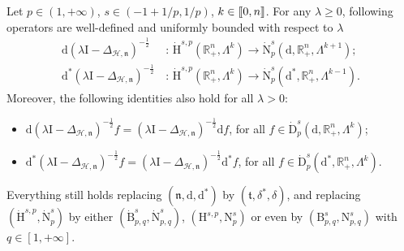 \documentclass[AHL,Unicode,longabstracts,published]{cedram}
\newcommand{\bbR}{\mathbb{R}}
\newcommand{\rmH}{\mathrm{H}}%
\newcommand{\rmB}{\mathrm{B}}
\newcommand{\rmd}{\mathrm{d}}
\newcommand{\rmD}{\mathrm{D}}
\newcommand{\rmN}{\mathrm{N}}
\newcommand{\rmI}{\mathrm{I}}
\newcommand{\clH}{\mathcal{H}}
\newcommand{\fkn}{\mathfrak{n}}
\newcommand{\fkt}{\mathfrak{t}}
\newcommand{\llbracket}{\mathopen{[\mkern -2.7mu[}}
\newcommand{\rrbracket}{\mathclose{]\mkern -2.7mu]}}
\newcommand{\llb}{\llbracket}
\newcommand{\rrb}{\rrbracket}
\begin{document}
\begin{prop}\label{prop:RieszTransformHodgeHspBspqRn+}
Let $p\in(1,+\infty)$, $s\in(-1+1/p,1/p)$, $k\in\llb 0,n\rrb$. For any $\lambda\geqslant 0$, following operators are well-defined and uniformly bounded with respect to $\lambda$
\begin{align*}
\rmd\left(\lambda \rmI -\Delta_{\clH,\fkn}\right)^{-\frac{1}{2}}\,&:\,\dot{\rmH}^{s,p}\left(\bbR^{n}_+,\Lambda^k\right)\longrightarrow \dot{\rmN}^{s}_{p}\left(\rmd,\bbR^{n}_+,\Lambda^{k+1}\right);\\
\rmd^\ast\left(\lambda \rmI -\Delta_{\clH,\fkn}\right)^{-\frac{1}{2}}\,&:\,\dot{\rmH}^{s,p}\left(\bbR^{n}_+,\Lambda^k\right)\longrightarrow \dot{\rmN }^{s}_{p}\left(\rmd^\ast,\bbR^{n}_+,\Lambda^{k-1}\right).
\end{align*}
Moreover, the following identities also hold for all $\lambda>0$:
\begin{itemize}
\item $\rmd(\lambda \rmI -\Delta_{\clH,\fkn})^{-\frac{1}{2}}f = (\lambda \rmI -\Delta_{\clH,\fkn})^{-\frac{1}{2}} \rmd f$, \qquad for all $f\in\dot{\rmD}^s_{p}(\rmd,\bbR^n_+,\Lambda^k)$;
\item $\rmd^\ast(\lambda \rmI -\Delta_{\clH,\fkn})^{-\frac{1}{2}}f = (\lambda \rmI -\Delta_{\clH,\fkn})^{-\frac{1}{2}} \rmd^\ast f$, \qquad for all $f\in\dot{\rmD}^s_{p}(\rmd^\ast,\bbR^n_+,\Lambda^k)$.
\end{itemize}
Everything still holds replacing $(\fkn,\rmd,\rmd^\ast)$ by $(\fkt,\delta^\ast,\delta)$, and replacing $(\dot{\rmH}^{s,p},\dot{\rmN}^{s}_{p})$ by either $(\dot{\rmB}^{s}_{p,q},\dot{\rmN }^{s}_{p,q})$, $({\rmH}^{s,p},{\rmN}^{s}_{p})$ or even by $({\rmB}^{s}_{p,q},{\rmN}^{s}_{p,q})$ with $q\in[1,+\infty]$.
\end{prop}
\end{document}
